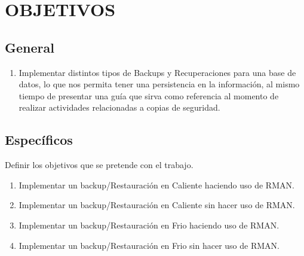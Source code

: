\chapter{OBJETIVOS}

\section{General}
\begin{enumerate}
\item Implementar distintos tipos de Backups y Recuperaciones para una base de datos, lo que nos permita tener una persistencia en la información, al mismo tiempo de presentar una guía que sirva como referencia al momento de realizar actividades relacionadas a copias de seguridad.
\end{enumerate}

\section{Espec\'ificos}
Definir los objetivos que se pretende con el trabajo.

\begin{enumerate}
\item Implementar un backup/Restauraci\'on en Caliente haciendo uso de RMAN.
\item Implementar un backup/Restauración en Caliente sin hacer uso de RMAN.
\item Implementar un backup/Restauración en Frio haciendo uso de RMAN.
\item Implementar un backup/Restauración en Frio sin hacer uso de RMAN.
\end{enumerate}